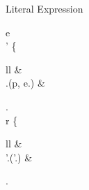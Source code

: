 \singlelineinferencerule
	{Literal Expression}
	{
		e \in \literaltype \\
		\state' \mathematicaldefinition
			\left\{
				\begin{array}{ll}
					 \state &  \\
					 \state.\addobjectfeature(p, e.\objectfeature) & \otherwisecondition
				\end{array}
			\right. \\
		r \mathematicaldefinition
			\left\{
				\begin{array}{ll}
					 \voidvalue & \condition{e = \voidliteral} \\
					 \state'.(\state'.\lastaddedobjectfeature) & \otherwisecondition
				\end{array}
			\right.
	}
	{}
	{}
 
